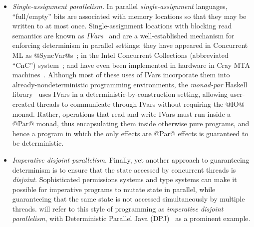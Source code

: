 \begin{itemize}
\item \emph{Single-assignment parallelism.}  In parallel
  \emph{single-assignment} languages, ``full/empty'' bits are
  associated with memory locations so that they may be written to at
  most once. Single-assignment locations with blocking read semantics
  are known as \emph{IVars}~\cite{IStructures} and are a
  well-established mechanism for enforcing determinism in parallel
  settings: they have appeared in Concurrent ML as
  @SyncVar@s~\cite{reppy-cml-book}; in the Intel Concurrent
  Collections (abbreviated ``CnC'') system~\cite{CnC}; and have even
  been implemented in hardware in Cray MTA machines~\cite{cray-mta}.
  Although most of these uses of IVars incorporate them into
  already-nondeterministic programming environments, the
  \emph{monad-par} Haskell library~\cite{monad-par} uses IVars in a
  deterministic-by-construction setting, allowing user-created threads
  to communicate through IVars without requiring the @IO@ monad.
  Rather, operations that read and write IVars must run inside a @Par@
  monad, thus encapsulating them inside otherwise pure programs, and
  hence a program in which the only effects are @Par@ effects is
  guaranteed to be deterministic.

\item \emph{Imperative disjoint parallelism.}  Finally, yet another
  approach to guaranteeing determinism is to ensure that the state
  accessed by concurrent threads is \emph{disjoint}.  Sophisticated
  permissions systems and type systems can make it possible for imperative
  programs to mutate state in parallel, while guaranteeing that the
  same state is not accessed simultaneously by multiple threads.  
  will refer to this style of programming as \emph{imperative disjoint
    parallelism}, with Deterministic Parallel Java
  (DPJ)~\cite{dpj-oopsla, dpj-hotpar09} as a prominent example.
\end{itemize}

